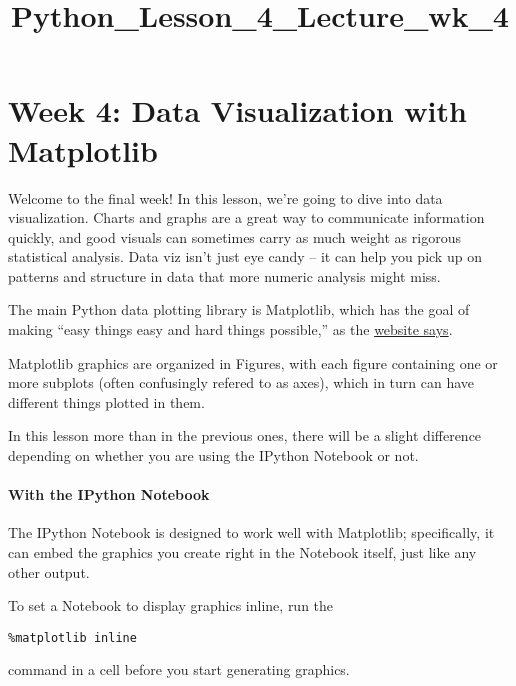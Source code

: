 \documentclass[11pt]{article}
\title{Python\_Lesson\_4\_Lecture\_wk\_4}
\begin{document}
    
    
    \maketitle
    
    

    
    \hypertarget{week-4-data-visualization-with-matplotlib}{%
\section{Week 4: Data Visualization with
Matplotlib}\label{week-4-data-visualization-with-matplotlib}}

Welcome to the final week! In this lesson, we're going to dive into data
visualization. Charts and graphs are a great way to communicate
information quickly, and good visuals can sometimes carry as much weight
as rigorous statistical analysis. Data viz isn't just eye candy -- it
can help you pick up on patterns and structure in data that more numeric
analysis might miss.

The main Python data plotting library is Matplotlib, which has the goal
of making ``easy things easy and hard things possible,'' as the
\href{http://matplotlib.org/}{website says}.

Matplotlib graphics are organized in Figures, with each figure
containing one or more subplots (often confusingly refered to as axes),
which in turn can have different things plotted in them.

In this lesson more than in the previous ones, there will be a slight
difference depending on whether you are using the IPython Notebook or
not.

\hypertarget{with-the-ipython-notebook}{%
\paragraph{With the IPython Notebook}\label{with-the-ipython-notebook}}

The IPython Notebook is designed to work well with Matplotlib;
specifically, it can embed the graphics you create right in the Notebook
itself, just like any other output.

To set a Notebook to display graphics inline, run the

\begin{verbatim}
%matplotlib inline
\end{verbatim}

command in a cell before you start generating graphics.
\end{document}
